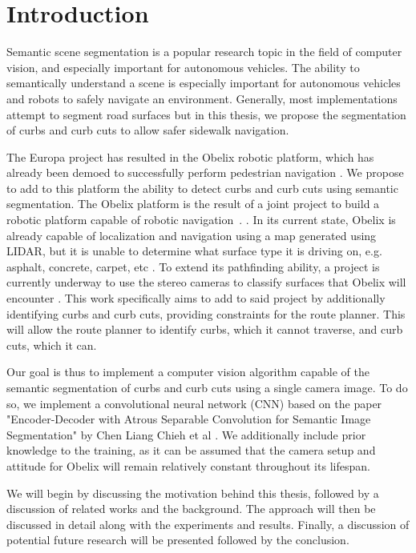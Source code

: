 \chapter{Introduction}\label{chap:introduction}
Semantic scene segmentation is a popular research topic in the field of computer vision, and especially important for autonomous vehicles.
The ability to semantically understand a scene is especially important for autonomous vehicles and robots to safely navigate an environment.
Generally, most implementations attempt to segment road surfaces but in this thesis, we propose the segmentation of curbs and curb cuts to allow safer sidewalk navigation.

The Europa project has resulted in the Obelix robotic platform, which has already been demoed to successfully perform pedestrian navigation \cite{europa}\cite{obelix-slam}.
We propose to add to this platform the ability to detect curbs and curb cuts using semantic segmentation.
The Obelix platform is the result of a joint project to build a robotic platform capable of robotic navigation~\cite{europa}. .
In its current state, Obelix is already capable of localization and navigation using a map generated using LIDAR, but it is unable to determine what surface type it is driving on, e.g. asphalt, concrete, carpet, etc \cite{jannik}.
To extend its pathfinding ability, a project is currently underway to use the stereo cameras to classify surfaces that Obelix will encounter \cite{jannik}.
This work specifically aims to add to said project by additionally identifying curbs and curb cuts, providing constraints for the route planner.
This will allow the route planner to identify curbs, which it cannot traverse, and curb cuts, which it can.

Our goal is thus to implement a computer vision algorithm capable of the semantic segmentation of curbs and curb cuts using a single camera image.
To do so, we implement a convolutional neural network (CNN) based on the paper "Encoder-Decoder with Atrous Separable Convolution for Semantic Image Segmentation" by Chen Liang Chieh et al \cite{deeplab}.
We additionally include prior knowledge to the training, as it can be assumed that the camera setup and attitude for Obelix will remain relatively constant throughout its lifespan.

We will begin by discussing the motivation behind this thesis, followed by a discussion of related works and the background.
The approach will then be discussed in detail along with the experiments and results.
Finally, a discussion of potential future research will be presented followed by the conclusion.
